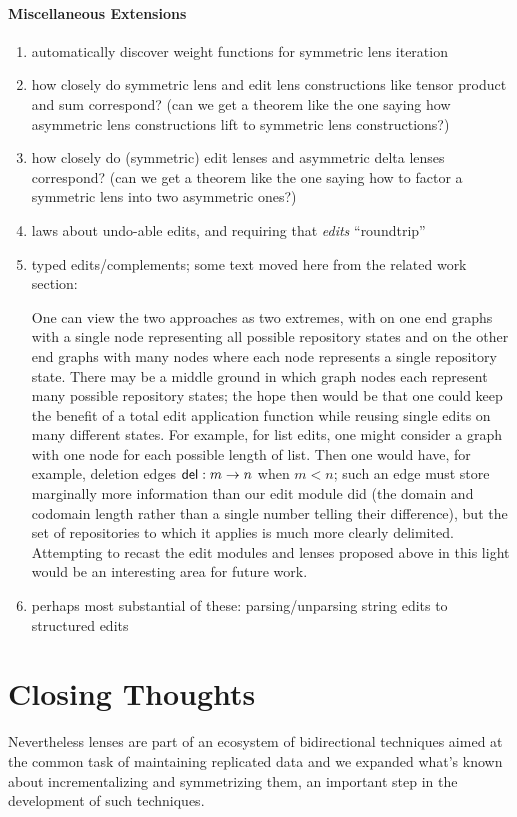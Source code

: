 \paragraph*{Miscellaneous Extensions}
\begin{enumerate}
    \item automatically discover weight functions for symmetric lens
        iteration
    \item how closely do symmetric lens and edit lens constructions like
        tensor product and sum correspond? (can we get a theorem like the
        one saying how asymmetric lens constructions lift to symmetric lens
        constructions?)
    \item how closely do (symmetric) edit lenses and asymmetric delta lenses
        correspond? (can we get a theorem like the one saying how to
        factor a symmetric lens into two asymmetric ones?)
    \item laws about undo-able edits, and requiring that \emph{edits} ``roundtrip''
    \item typed edits/complements; some text moved here from the related
        work section:

        One can view the two approaches as two extremes, with on one end
        graphs with a single node representing all possible repository
        states and on the other end graphs with many nodes where each node
        represents a single repository state. There may be a middle ground
        in which graph nodes each represent many possible repository states;
        the hope then would be that one could keep the benefit of a total
        edit application function while reusing single edits on many
        different states. For example, for list edits, one might consider a
        graph with one node for each possible length of list. Then one would
        have, for example, deletion edges $\mathsf{del} : m \to n$ when
        $m<n$; such an edge must store marginally more information than our
        edit module did (the domain and codomain length rather than a single
        number telling their difference), but the set of repositories to
        which it applies is much more clearly delimited. Attempting to
        recast the edit modules and lenses proposed above in this light
        would be an interesting area for future work.
    \item perhaps most substantial of these: parsing/unparsing string edits
        to structured edits
\end{enumerate}

\section{Closing Thoughts}
\label{sec:closing}
Nevertheless lenses are part of an ecosystem of bidirectional techniques
aimed at the common task of maintaining replicated data and we expanded
what's known about incrementalizing and symmetrizing them, an important step
in the development of such techniques.
